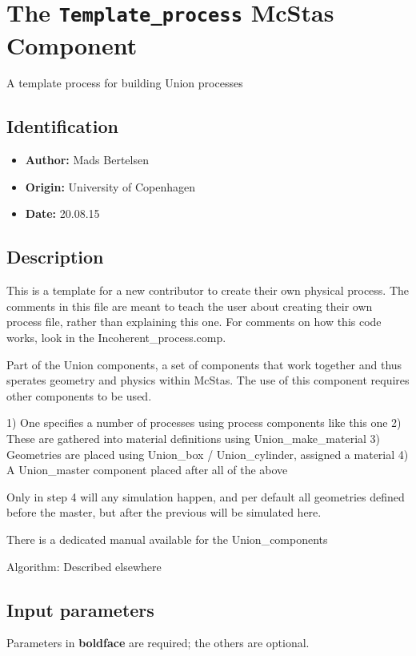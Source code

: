 \section{The \texttt{Template\_process} McStas Component}
A template process for building Union processes

\subsection*{Identification}
\begin{itemize}
  \item \textbf{Author:} Mads Bertelsen
  \item \textbf{Origin:} University of Copenhagen
  \item \textbf{Date:} 20.08.15
\end{itemize}

\subsection*{Description}
This is a template for a new contributor to create their own physical process. The comments in this file are meant to teach the user about creating their own process file, rather than explaining this one. For comments on how this code works, look in the Incoherent\_process.comp.

Part of the Union components, a set of components that work together and thus sperates geometry and physics within McStas. The use of this component requires other components to be used.

1) One specifies a number of processes using process components like this one 2) These are gathered into material definitions using Union\_make\_material 3) Geometries are placed using Union\_box / Union\_cylinder, assigned a material 4) A Union\_master component placed after all of the above

Only in step 4 will any simulation happen, and per default all geometries defined before the master, but after the previous will be simulated here.

There is a dedicated manual available for the Union\_components

Algorithm: Described elsewhere

\subsection*{Input parameters}
Parameters in \textbf{boldface} are required; the others are optional.

